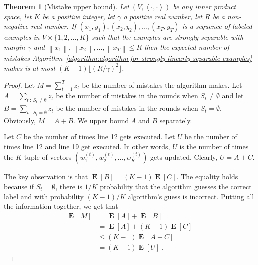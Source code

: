 \documentclass[12pt]{article}
\newtheorem{theorem}[definition]{Theorem}
\newcommand{\ip}[2]{\left\langle #1, #2 \right\rangle} %
\newcommand{\norm}[1]{\left\| #1 \right\|}  %
\DeclareMathOperator*{\Exp}{\mathbf{E}}  %
\begin{document}
\begin{theorem}[Mistake upper bound]
\label{theorem:strongly-separable-example-mistake-upper-bound}
Let $(V, \ip{\cdot}{\cdot})$ be any inner product space, let $K$ be a positive
integer, let $\gamma$ a positive real number, let $R$ be a non-negative real number. If
$(x_1, y_1), (x_2, y_2), \dots, (x_T, y_T)$ is a sequence of labeled examples in
$V \times \{1,2,\dots,K\}$ such that the examples are strongly separable with
margin $\gamma$ and $\norm{x_1}, \norm{x_2}, \dots, \norm{x_T} \le R$ then the
expected number of mistakes
Algorithm~\ref{algorithm:algorithm-for-strongly-linearly-separable-examples}
makes is at most $(K-1) \lfloor (R/\gamma)^2 \rfloor$.
\end{theorem}

\begin{proof}
Let $M = \sum_{t=1}^T z_t$ be the number of mistakes the algorithm makes. Let $A
= \sum_{t ~:~ S_t \neq \emptyset} z_t$ be the number of mistakes in the rounds
when $S_t \neq \emptyset$ and let $B = \sum_{t ~:~ S_t = \emptyset} z_t$ be the
number of mistakes in the rounds when $S_t = \emptyset$. Obviously, $M = A + B$.
We upper bound $A$ and $B$ separately.

Let $C$ be the number of times line 12 gets executed. Let $U$ be the number of
times line 12 and line 19 get executed. In other words, $U$ is the number of
times the $K$-tuple of vectors $(w_1^{(t)}, w_2^{(t)}, \dots, w_K^{(t)})$ gets
updated. Clearly, $U = A + C$.

The key observation is that $\Exp[B] = (K-1) \Exp[C]$. The equality holds
because if $S_t = \emptyset$, there is $1/K$ probability that the algorithm
guesses the correct label and with probability $(K-1)/K$ algorithm's guess is
incorrect. Putting all the information together, we get that
\begin{align*}
\Exp[M]
& = \Exp[A] + \Exp[B] \\
& = \Exp[A] + (K-1) \Exp[C]  \\
& \le (K-1) \Exp[A + C] \\
& = (K-1) \Exp[U]  \; .
\end{align*}


\end{proof}
\end{document}
